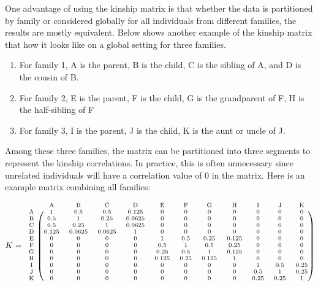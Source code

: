 One advantage of using the kinship matrix is that whether the data is partitioned by family or considered globally for all individuals from different families, the results are mostly equivalent.
Below shows another example of the kinship matrix that how it looks like on a global setting for three families.
\begin{enumerate}
    \item For family 1, A is the parent, B is the child, C is the sibling of A, and D is the cousin of B. 
    \item For family 2, E is the parent, F is the child, G is the grandparent of F, H is the half-sibling of F
    \item For family 3, I is the parent, J is the child, K is the aunt or uncle of J.
\end{enumerate}
Among these three families, the matrix can be partitioned into three segments to represent the kinship correlations.
In practice, this is often unnecessary since unrelated individuals will have a correlation value of 0 in the matrix.
Here is an example matrix combining all families:

\begin{equation*}
    \scriptsize
    K = \begin{blockarray}{cccccccccccc}
        & \matindex{A} & \matindex{B} & \matindex{C} & \matindex{D} & \matindex{E} & \matindex{F} & \matindex{G} & \matindex{H} & \matindex{I} & \matindex{J} & \matindex{K} \\
        \begin{block}{c(ccccccccccc)}
            \matindex{A} & 1 & 0.5 & 0.5 & 0.125 & 0 & 0 & 0 & 0 & 0 & 0 & 0  \\
            \matindex{B} & 0.5 & 1 & 0.25 & 0.0625 & 0 & 0 & 0 & 0 & 0 & 0 & 0  \\
            \matindex{C} & 0.5 & 0.25 & 1 & 0.0625 & 0 & 0 & 0 & 0 & 0 & 0 & 0  \\
            \matindex{D} & 0.125 & 0.0625 & 0.0625 & 1 & 0 & 0 & 0 & 0 & 0 & 0 & 0  \\
            \matindex{E} & 0 & 0 & 0 & 0 & 1 & 0.5 & 0.25 & 0.125 & 0 & 0 & 0  \\
            \matindex{F} & 0 & 0 & 0 & 0 & 0.5 & 1 & 0.5 & 0.25 & 0 & 0 & 0  \\
            \matindex{G} & 0 & 0 & 0 & 0 & 0.25 & 0.5 & 1 & 0.125 & 0 & 0 & 0  \\
            \matindex{H} & 0 & 0 & 0 & 0 & 0.125 & 0.25 & 0.125 & 1 & 0 & 0 & 0  \\
            \matindex{I} & 0 & 0 & 0 & 0 & 0 & 0 & 0 & 0 & 1 & 0.5 & 0.25  \\
            \matindex{J} & 0 & 0 & 0 & 0 & 0 & 0 & 0 & 0 & 0.5 & 1 & 0.25  \\
            \matindex{K} & 0 & 0 & 0 & 0 & 0 & 0 & 0 & 0 & 0.25 & 0.25 & 1  \\
        \end{block}
    \end{blockarray}
\end{equation*}

